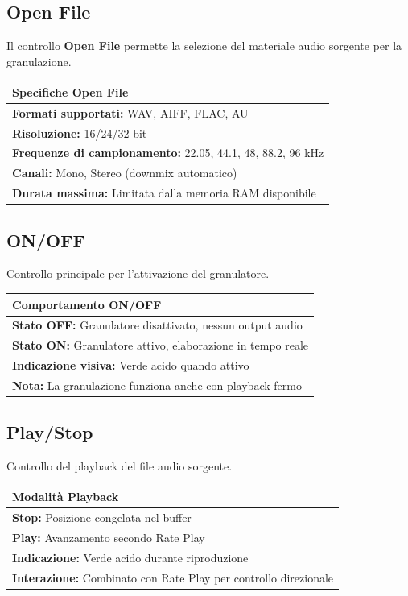 \documentclass[a4paper,11pt,openany]{book}
\newenvironment{parambox}[1]{
    \begin{center}
    \begin{tabular}{|p{0.9\textwidth}|}
    \hline
    \textbf{#1} \\
    \hline
}{
    \hline
    \end{tabular}
    \end{center}
}
\begin{document}
\subsection{Open File}

Il controllo \textbf{Open File} permette la selezione del materiale audio sorgente per la granulazione.

\begin{parambox}{Specifiche Open File}
\textbf{Formati supportati:} WAV, AIFF, FLAC, AU \\
\textbf{Risoluzione:} 16/24/32 bit \\
\textbf{Frequenze di campionamento:} 22.05, 44.1, 48, 88.2, 96 kHz \\
\textbf{Canali:} Mono, Stereo (downmix automatico) \\
\textbf{Durata massima:} Limitata dalla memoria RAM disponibile
\end{parambox}

\subsection{ON/OFF}

Controllo principale per l'attivazione del granulatore.

\begin{parambox}{Comportamento ON/OFF}
\textbf{Stato OFF:} Granulatore disattivato, nessun output audio \\
\textbf{Stato ON:} Granulatore attivo, elaborazione in tempo reale \\
\textbf{Indicazione visiva:} Verde acido quando attivo \\
\textbf{Nota:} La granulazione funziona anche con playback fermo
\end{parambox}

\subsection{Play/Stop}

Controllo del playback del file audio sorgente.

\begin{parambox}{Modalità Playback}
\textbf{Stop:} Posizione congelata nel buffer \\
\textbf{Play:} Avanzamento secondo Rate Play \\
\textbf{Indicazione:} Verde acido durante riproduzione \\
\textbf{Interazione:} Combinato con Rate Play per controllo direzionale
\end{parambox}
\end{document}
